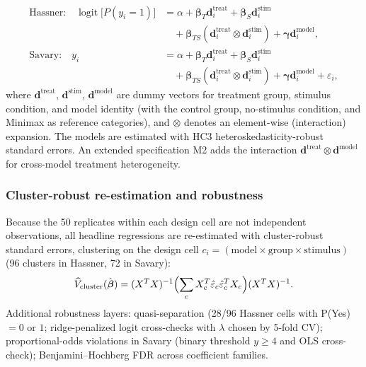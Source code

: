\documentclass[14pt,a4paper]{extarticle}
\begin{document}
\begin{align}
\text{Hassner:} \quad \operatorname{logit}\bigl[P(y_i = 1)\bigr] &= \alpha + \boldsymbol{\beta}_T \mathbf{d}^{\mathrm{treat}}_i + \boldsymbol{\beta}_S \mathbf{d}^{\mathrm{stim}}_i \nonumber \\
&\quad + \boldsymbol{\beta}_{TS}(\mathbf{d}^{\mathrm{treat}}_i \otimes \mathbf{d}^{\mathrm{stim}}_i) + \boldsymbol{\gamma} \mathbf{d}^{\mathrm{model}}_i, \label{eq:logit} \\
\text{Savary:} \quad y_i &= \alpha + \boldsymbol{\beta}_T \mathbf{d}^{\mathrm{treat}}_i + \boldsymbol{\beta}_S \mathbf{d}^{\mathrm{stim}}_i \nonumber \\
&\quad + \boldsymbol{\beta}_{TS}(\mathbf{d}^{\mathrm{treat}}_i \otimes \mathbf{d}^{\mathrm{stim}}_i) + \boldsymbol{\gamma} \mathbf{d}^{\mathrm{model}}_i + \varepsilon_i, \label{eq:ols}
\end{align}
where $\mathbf{d}^{\mathrm{treat}}$, $\mathbf{d}^{\mathrm{stim}}$, $\mathbf{d}^{\mathrm{model}}$ are dummy vectors for treatment group, stimulus condition, and model identity (with the control group, no-stimulus condition, and Minimax as reference categories), and $\otimes$ denotes an element-wise (interaction) expansion. The models are estimated with HC3 heteroskedasticity-robust standard errors. An extended specification M2 adds the interaction $\mathbf{d}^{\mathrm{treat}} \otimes \mathbf{d}^{\mathrm{model}}$ for cross-model treatment heterogeneity.

\subsubsection*{Cluster-robust re-estimation and robustness}

Because the 50 replicates within each design cell are not independent observations, all headline regressions are re-estimated with cluster-robust standard errors, clustering on the design cell $c_i = (\text{model} \times \text{group} \times \text{stimulus})$ (96 clusters in Hassner, 72 in Savary):
\begin{equation}
\widehat{V}_{\mathrm{cluster}}(\hat{\boldsymbol{\beta}}) = (X^TX)^{-1} \Bigl(\sum_{c} X_c^T \hat{\varepsilon}_c \hat{\varepsilon}_c^T X_c\Bigr) (X^TX)^{-1}.
\label{eq:cov-cluster}
\end{equation}
Additional robustness layers: quasi-separation (28/96 Hassner cells with P(Yes)$=0$ or $1$; ridge-penalized logit cross-checks with $\lambda$ chosen by 5-fold CV); proportional-odds violations in Savary (binary threshold $y \geq 4$ and OLS cross-check); Benjamini--Hochberg FDR across coefficient families.
\end{document}
